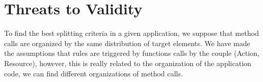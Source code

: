 \section{Threats to Validity} \label{sec:validity}
To find the best splitting criteria in a given application, we suppose that method calls are organized by the same distribution of target elements.
We have made the assumptions that rules are triggered by functions calls by the couple (Action, Resource), however, this is really related to the organization  of the application code, we can find
different organizations of method calls.